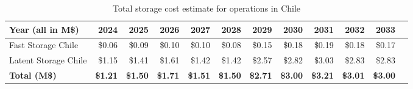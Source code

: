 \tiny \begin{longtable} { |p{}  |r  |r  |r  |r  |r  |r  |r  |r  |r  |r  |r |} 
\caption{Total storage cost estimate for operations in Chile \label{tab:opsStorageChile}}\\ 
\hline 
\textbf{Year (all in M\$)}&\textbf{2024}&\textbf{2025}&\textbf{2026}&\textbf{2027}&\textbf{2028}&\textbf{2029}&\textbf{2030}&\textbf{2031}&\textbf{2032}&\textbf{2033} \\ \hline
{Fast Storage Chile}&{\$0.06}&{\$0.09}&{\$0.10}&{\$0.10}&{\$0.08}&{\$0.15}&{\$0.18}&{\$0.19}&{\$0.18}&{\$0.17} \\ \hline
{Latent Storage Chile}&{\$1.15}&{\$1.41}&{\$1.61}&{\$1.42}&{\$1.42}&{\$2.57}&{\$2.82}&{\$3.03}&{\$2.83}&{\$2.83} \\ \hline
\textbf{Total (M\$)}&\textbf{\$1.21}&\textbf{\$1.50}&\textbf{\$1.71}&\textbf{\$1.51}&\textbf{\$1.50}&\textbf{\$2.71}&\textbf{\$3.00}&\textbf{\$3.21}&\textbf{\$3.01}&\textbf{\$3.00} \\ \hline
\end{longtable} \normalsize

